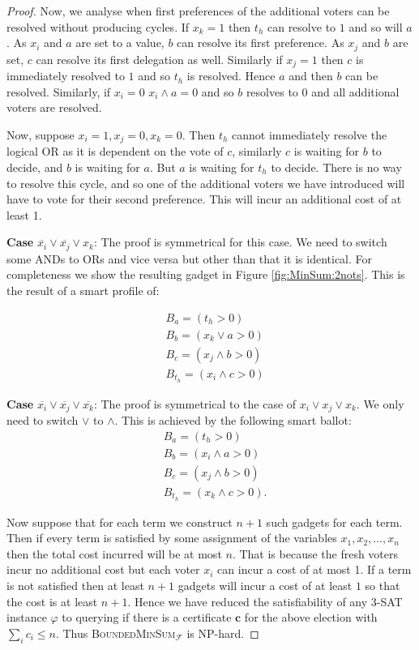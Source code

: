 \documentclass[11pt,a4paper, titlepage]{article}
\theoremstyle{definition}
\let\vec\mathbf
\begin{document}
\begin{proof}
    Now, we analyse when first preferences of the additional voters can be resolved without producing cycles. 
    If $x_k = 1$ then $t_h$ can resolve to $1$ and so will $a$. 
    As $x_i$ and $a$ are set to a value, $b$ can resolve its first preference. 
    As $x_j$ and $b$ are set, $c$ can resolve its first delegation as well. 
    Similarly if $x_j = 1$ then $c$ is immediately resolved to $1$ and so $t_h$ is resolved. 
    Hence $a$ and then $b$ can be resolved. 
    Similarly, if $x_i = 0$ $x_i \land a = 0$ and so $b$ resolves to $0$ and all additional voters are resolved.
    
    Now, suppose $x_i = 1, x_j = 0, x_k = 0$. Then $t_h$ cannot immediately resolve the logical OR as it is dependent on the vote of $c$, similarly $c$ is waiting for $b$ to decide, and $b$ is waiting for $a$. 
    But $a$ is waiting for $t_h$ to decide. 
    There is no way to resolve this cycle, and so one of the additional voters we have introduced will have to vote for their second preference. 
    This will incur an additional cost of at least 1.

    \textbf{Case} $\overline{x_i} \lor \overline{x_j} \lor x_k$: 
    The proof is symmetrical for this case. We need to switch some ANDs to ORs and vice versa but other than that it is identical. 
    For completeness we show the resulting gadget in Figure \ref{fig:MinSum:2nots}. 
    This is the result of a smart profile of:

    \begin{align*}
        &B_a = (t_h > 0) \\
        &B_b = (x_k \lor a > 0) \\
        &B_c = (x_j \land b > 0) \\
        &B_{t_h} = (x_i \land c > 0)
    \end{align*}

    \textbf{Case} $\overline{x_i} \lor \overline{x_j} \lor \overline{x_k}$:
    The proof is symmetrical to the case of $x_i \lor x_j \lor x_k$. We only need to switch $\lor$ to $\land$. This is achieved by the following smart ballot:
    \begin{align*}
        &B_a = (t_h > 0) \\
        &B_b = (x_i \land a > 0) \\
        &B_c = (x_j \land b > 0) \\
        &B_{t_h} = (x_k \land c > 0).
    \end{align*}
    
    Now suppose that for each term we construct $n + 1$ such gadgets for each term. Then if every term is satisfied by some assignment of the variables $x_1, x_2, \ldots, x_n$ then the total cost incurred will be at most $n$. That is because the fresh voters incur no additional cost but each voter $x_i$ can incur a cost of at most 1.
    If a term is not satisfied then at least $n+1$ gadgets will incur a cost of at least $1$ so that the cost is at least $n+1$. 
    Hence we have reduced the satisfiability of any \textsc{3-SAT} instance $\varphi$ to querying if there is a certificate $\vec{c}$ for the above election with $\sum_{i} c_i \leq n$. Thus \textsc{BoundedMinSum}$_\mathcal{F}$ is NP-hard.
\end{proof}
\end{document}
